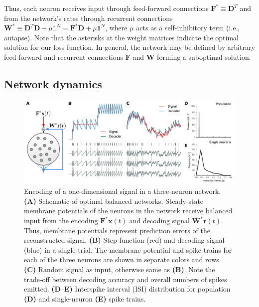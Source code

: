 \documentclass[twoside,twocolumn]{article}
\renewcommand{\b}[1]{\textbf{#1}}
\begin{document}
Thus, each neuron receives input through feed-forward connections $\b{F}^*\equiv\b{D}^T$ and from the network's rates through recurrent connections $\b{W}^*\equiv\b{D}^T\b{D}  + \mu \mathbb{1}^N = \b{F}^*\b{D}  + \mu \mathbb{1}^N$, where $\mu$ acts as a self-inhibitory term (i.e., autapse). Note that the asterisks at the weight matrices indicate the optimal solution for our loss function. In general, the network may be defined by arbitrary feed-forward and recurrent connections $\b{F}$ and $\b{W}$ forming a suboptimal solution.

\subsection{Network dynamics}

\begin{figure}[!ht]
  \includegraphics[width=\textwidth]{../plots/Fig1.pdf}
  \caption{Encoding of a one-dimensional signal in a three-neuron network. \textbf{(A)} Schematic of optimal balanced networks. Steady-state membrane potentials of the neurons in the network receive balanced input from the encoding $\b{F}^*\b{x}(t)$ and decoding signal $\b{W}^*\b{r}(t)$. Thus, membrane potentials represent prediction errors of the reconstructed signal. \textbf{(B)} Step function (red) and decoding signal (blue) in a single trial. The membrane potential and spike trains for each of the three neurons are shown in separate colors and rows. \textbf{(C)} Random signal as input, otherwise same as \textbf{(B)}. Note the trade-off between decoding accuracy and overall numbers of spikes emitted. \textbf{(D}--\textbf{E)} Interspike interval (ISI) distribution for population \textbf{(D)} and single-neuron \textbf{(E)} spike trains.}
  \label{fig:1Dsys}
\end{figure} 
\end{document}
